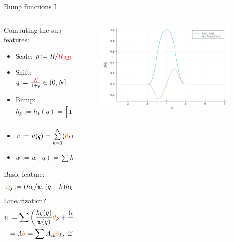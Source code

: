 \documentclass{beamer}
\begin{document}
\begin{frame}{Bump functions I}
    \fontsize{6.5}{5}\selectfont
    \begin{columns}
        \begin{column}{0.4\textwidth}
            Computing the sub-features:
            \begin{itemize}
                \item Scale: $\rho := R/{\color{red}R_{AB}}$
                \item Shift: $q := \frac{\color{red}{N}}{1+\rho} \in (0, N]$
                \item Bump: $h_k := h_k(q) = [1 - (q - k)^2]^3_+$
                \item $u := u(q) =  \sum^N\limits_{k=0}({\color{orange}\theta}_k(q-k)+{\color{orange}\theta}_{k+N+1})h_k$
                \item $w := w(q) = \sum h_k$
            \end{itemize}
            Basic feature:
            \begin{equation}
                {\color{olive}z}_{ij} := (h_k/w, (q-k)h_k/w).
            \end{equation}
            Linearization?
            \begin{equation}
                \begin{split}
                    u & := \sum \left(\frac{h_k(q)}{w(q)}{\color{orange}\theta}_k + \frac{(q-k)h_k(q)}{w(q)}{\color{orange}\theta}_{k+N+1}\right) \\
                    & = A{\color{orange}\theta} = \sum A_{ik}{\color{orange}\theta}_k, \text{ if }q=q_i.
                \end{split}
            \end{equation}
        \end{column}
        \begin{column}{0.6\textwidth}
            \begin{figure}[H]
                \centering
                    \includegraphics[scale=0.33]{img/BUMP/BUMP_k=5.png}
                \label{fig:bumpxy}
            \end{figure}
        \end{column}
    \end{columns}
\end{frame}
\end{document}
